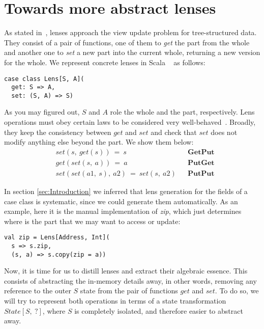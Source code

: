 \documentclass[preview, 3p]{elsarticle}
\begin{document}
\section{Towards more abstract lenses}
\label{sec:Towards}

As stated in~\cite{foster2005combinators}, lenses approach the view update
problem for tree-structured data. They consist of a pair of functions, one of
them to \emph{get} the part from the whole and another one to \emph{set} a new
part into the current whole, returning a new version for the whole. We represent
concrete lenses in Scala ~\cite{morris2012asymmetric} as follows:

\begin{lstlisting}
case class Lens[S, A](
  get: S => A,
  set: (S, A) => S)
\end{lstlisting}

As you may figured out, $S$ and $A$ role the whole and the part, respectively.
Lens operations must obey certain laws to be considered very
well-behaved~\cite{fischer2015clear}. Broadly, they keep the consistency between
$get$ and $set$ and check that $set$ does not modify anything else beyond the
part. We show them below:
\begin{align*}
  & set(s,\ get(s))\ =\ s &&\textbf{GetPut} \\
  & get(set(s,\ a))\ =\ a &&\textbf{PutGet} \\
  & set(set(a1,\ s),\ a2)\ =\ set(s,\ a2) &&\textbf{PutPut}
\end{align*}

In section \ref{sec:Introduction} we inferred that lens generation for the
fields of a case class is systematic, since we could generate them
automatically. As an example, here it is the manual implementation of
\emph{zip}, which just determines where is the part that we may want to access
or update:

\begin{lstlisting}
val zip = Lens[Address, Int](
  s => s.zip,
  (s, a) => s.copy(zip = a))
\end{lstlisting}

Now, it is time for us to distill lenses and extract their algebraic essence.
This consists of abstracting the in-memory details away, in other words,
removing any reference to the outer $S$ state from the pair of functions $get$
and $set$. To do so, we will try to represent both operations in terms of a
state transformation $State[S,\ ?]$, where $S$ is completely isolated, and
therefore easier to abstract away.
\end{document}
